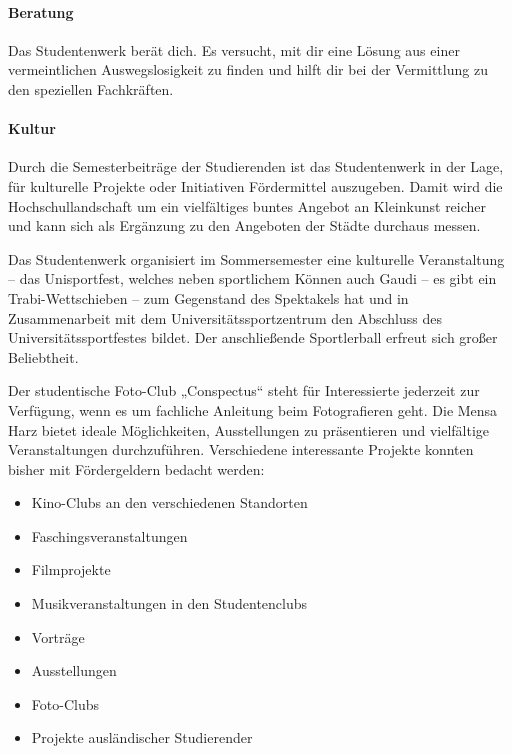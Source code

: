 \paragraph{Beratung}
Das Studentenwerk berät dich.
Es versucht, mit dir eine Lösung aus einer vermeintlichen Auswegslosigkeit zu finden und hilft dir bei der Vermittlung zu den speziellen Fachkräften.

\paragraph{Kultur}
Durch die Semesterbeiträge der Studierenden ist das Studentenwerk in der Lage, für kulturelle Projekte oder Initiativen Fördermittel auszugeben.
Damit wird die Hochschullandschaft um ein vielfältiges buntes Angebot an Kleinkunst reicher und kann sich als Ergänzung zu den Angeboten der Städte durchaus messen.

Das Studentenwerk organisiert im Sommersemester eine kulturelle Veranstaltung -- das Unisportfest, welches neben sportlichem Können auch Gaudi -- es gibt ein Trabi-Wettschieben -- zum Gegenstand des Spektakels hat und in Zusammenarbeit mit dem Universitätssportzentrum den Abschluss des Universitätssportfestes bildet.
Der anschließende Sportlerball erfreut sich großer Beliebtheit.

Der studentische Foto-Club „Conspectus“ steht für Interessierte jederzeit zur Ver\-fügung, wenn es um fachliche Anleitung beim Fotografieren geht.
Die Mensa Harz bietet ideale Möglichkeiten, Ausstellungen zu präsentieren und vielfältige Veranstaltungen durchzuführen.
Verschiedene interessante Projekte konnten bisher mit Fördergeldern bedacht werden:

\begin{itemize}
    \item Kino-Clubs an den verschiedenen Standorten
    \item Faschingsveranstaltungen
    \item Filmprojekte
    \item Musikveranstaltungen in den Studentenclubs
    \item Vorträge
    \item Ausstellungen
    \item Foto-Clubs
    \item Projekte ausländischer Studierender
\end{itemize}

